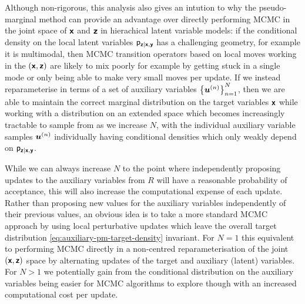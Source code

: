 Although non-rigorous, this analysis also gives an intution to why the pseudo-marginal method can provide an advantage over directly performing \ac{MCMC} in the joint space of $\boldsymbol{\mathsf{x}}$ and $\boldsymbol{\mathsf{z}}$ in hierachical latent variable models: if the conditional density on the local latent variables $\mathsf{p}_{\boldsymbol{\mathsf{z}}|\boldsymbol{\mathsf{x}},\boldsymbol{\mathsf{y}}}$ has a challenging geometry, for example it is multimodal, then \ac{MCMC} transition operators based on local moves working in the $(\boldsymbol{\mathsf{x}},\boldsymbol{\mathsf{z}})$ are likely to mix poorly for example by getting stuck in a single mode or only being able to make very small moves per update. If we instead reparameterise in terms of a set of auxiliary variables $\lbr \vct{u}^{(n)} \rbr_{n=1}^N$, then we are able to maintain the correct marginal distribution on the target variables $\boldsymbol{\mathsf{x}}$ while working with a distribution on an extended space which becomes increasingly tractable to sample from as we increase $N$, with the individual auxiliary variable samples $\boldsymbol{u}^{(n)}$ individually having conditional densities which only weakly depend on $\mathsf{p}_{\boldsymbol{\mathsf{z}}|\boldsymbol{\mathsf{x}},\boldsymbol{\mathsf{y}}}$.

While we can always increase $N$ to the point where independently proposing updates to the auxiliary variables from $R$ will have a reasonable probability of acceptance, this will also increase the computational expense of each update. Rather than proposing new values for the auxiliary variables independently of their previous values, an obvious idea is to take a more standard \ac{MCMC} approach by using local perturbative updates which leave the overall target distribution \eqref{eq:auxiliary-pm-target-density} invariant. For $N=1$ this equivalent to performing \ac{MCMC} directly in a non-centred reparameterisation \citep{papaspiliopoulos2003non} of the joint $(\boldsymbol{\mathsf{x}},\boldsymbol{\mathsf{z}})$ space by alternating updates of the target and auxiliary (latent) variables. For $N > 1$ we potentially gain from the conditional distribution on the auxiliary variables being easier for \ac{MCMC} algorithms to explore though with an increased computational cost per update.

